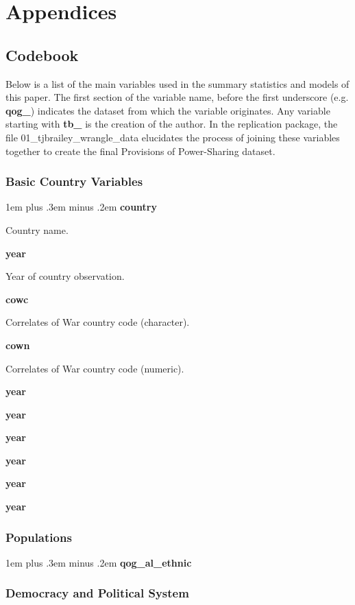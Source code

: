\documentclass[12pt]{article}
\begin{document}
\pagebreak

\section{Appendices}
\subsection{Codebook}

Below is a list of the main variables used in the summary statistics and models of this paper. The first section of the variable name, before the first underscore (e.g. \textbf{qog\_}) indicates the dataset from which the variable originates. Any variable starting with \textbf{tb\_} is the creation of the author. In the replication package, the file 01\_tjbrailey\_wrangle\_data elucidates the process of joining these variables together to create the final Provisions of Power-Sharing dataset.  

\newlength\cbl
\newenvironment{codebook}[1][rob\_avprison1]{
	\settowidth{\cbl}{#1}
	\parskip1em plus .3em minus .2em
	\parindent0pt
	\def\code##1##2{{\bfseries ##1}\hfill%
		\parbox[t]{\dimexpr\linewidth-15em-\cbl}{##2}\par}}{\noindent}

\subsubsection{Basic Country Variables}

\singlespacing
	
	\begin{codebook}
		\code{country}{Country name.}
		\code{year}{Year of country observation.}
		\code{cowc}{Correlates of War country code (character).}
		\code{cown}{Correlates of War country code (numeric).}
		\code{year}{}
		\code{year}{}
		\code{year}{}
		\code{year}{}
		\code{year}{}
		\code{year}{}
	\end{codebook}

\subsubsection{Populations}

\begin{codebook}
	\code{qog\_al\_ethnic}{}
	\code{}{}
\end{codebook}

\subsubsection{Democracy and Political System}
\end{document}
